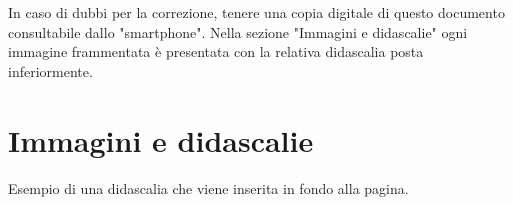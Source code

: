 \documentclass[hidelinks,12pt,a4paper]{article}
\begin{document}
	
	\vspace*{\fill}
	\centering
	\fboxrule=2pt
	\fbox
	{
		\begin{minipage}{\linewidth}
			In caso di dubbi per la correzione, tenere una copia digitale di questo documento consultabile dallo "smartphone". Nella sezione "Immagini e didascalie" ogni immagine frammentata è presentata con la relativa didascalia posta inferiormente.
		\end{minipage}
	}

	\newpage
	\section{Immagini e didascalie}
	
	
	\begin{minipage}{\linewidth}
		
	
	\hfill{
}
	\end{minipage}

\begin{minipage}{\linewidth}
	
	
	\hfill{
}
\end{minipage}
	
	\vspace*{\fill}
	\centering
	\fboxrule=2pt
	\fbox
	{
		\begin{minipage}{\linewidth}
		Esempio di una didascalia che viene inserita in fondo alla pagina.
		\end{minipage}
	}
	
\end{document}
